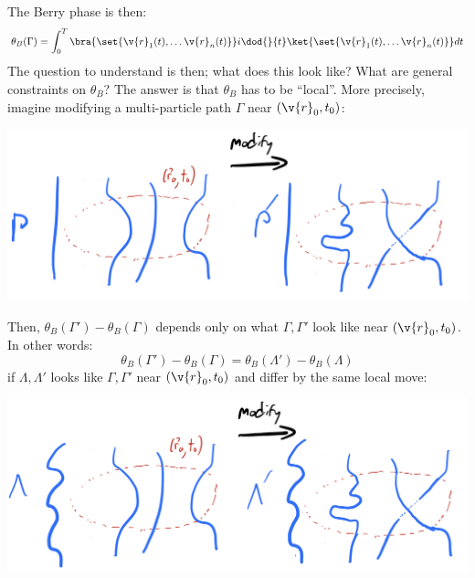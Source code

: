 The Berry phase is then:
\begin{equation}
    \theta_B(\Gamma) = \int_0^T \bra{\set{\v{r}_1(t), \ldots \v{r}_n(t)}}i\dod{}{t} \ket{\set{\v{r}_1(t), \ldots \v{r}_n(t)}} dt
\end{equation}
The question to understand is then; what does this look like? What are general constraints on $\theta_B$? The answer is that $\theta_B$ has to be ``local''. More precisely, imagine modifying a multi-particle path $\Gamma$ near $(\v{r}_0, t_0)$:

\begin{center}
    \includegraphics[scale=0.3]{Lectures/Images/lec4-localgammamod.png}
\end{center}

Then, $\theta_B(\Gamma') - \theta_B(\Gamma)$ depends only on what $\Gamma, \Gamma'$ look like near $(\v{r}_0, t_0)$. In other words:
\begin{equation}\label{eq:berryphasediff}
    \theta_B(\Gamma') - \theta_B(\Gamma) = \theta_B(\Lambda') - \theta_B(\Lambda)
\end{equation}
if $\Lambda, \Lambda'$ looks like $\Gamma, \Gamma'$ near $(\v{r}_0, t_0)$ and differ by the same local move:

\begin{center}
    \includegraphics[scale=0.3]{Lectures/Images/lec4-localdeltamod.png}
\end{center}

